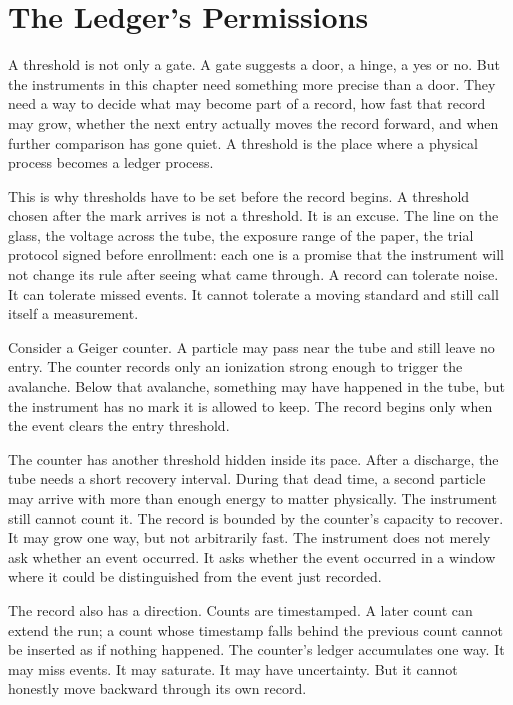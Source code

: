 \chapter{The Ledger's Permissions}
\label{chap:ledger-permissions}


A threshold is not only a gate. A gate suggests a door, a hinge, a yes or no.
But the instruments in this chapter need something more precise than a door.
They need a way to decide what may become part of a record, how fast that
record may grow, whether the next entry actually moves the record forward, and
when further comparison has gone quiet. A threshold is the place where a
physical process becomes a ledger process.

This is why thresholds have to be set before the record begins. A threshold
chosen after the mark arrives is not a threshold. It is an excuse. The line on
the glass, the voltage across the tube, the exposure range of the paper, the
trial protocol signed before enrollment: each one is a promise that the
instrument will not change its rule after seeing what came through. A record
can tolerate noise. It can tolerate missed events. It cannot tolerate a moving
standard and still call itself a measurement.

Consider a Geiger counter. A particle may pass near the tube and still leave
no entry. The counter records only an ionization strong enough to trigger the
avalanche. Below that avalanche, something may have happened in the tube, but
the instrument has no mark it is allowed to keep. The record begins only when
the event clears the entry threshold.

The counter has another threshold hidden inside its pace. After a discharge,
the tube needs a short recovery interval. During that dead time, a second
particle may arrive with more than enough energy to matter physically. The
instrument still cannot count it. The record is bounded by the counter's
capacity to recover. It may grow one way, but not arbitrarily fast. The
instrument does not merely ask whether an event occurred. It asks whether the
event occurred in a window where it could be distinguished from the event just
recorded.

The record also has a direction. Counts are timestamped. A later count can
extend the run; a count whose timestamp falls behind the previous count cannot
be inserted as if nothing happened. The counter's ledger accumulates one way.
It may miss events. It may saturate. It may have uncertainty. But it cannot
honestly move backward through its own record.

